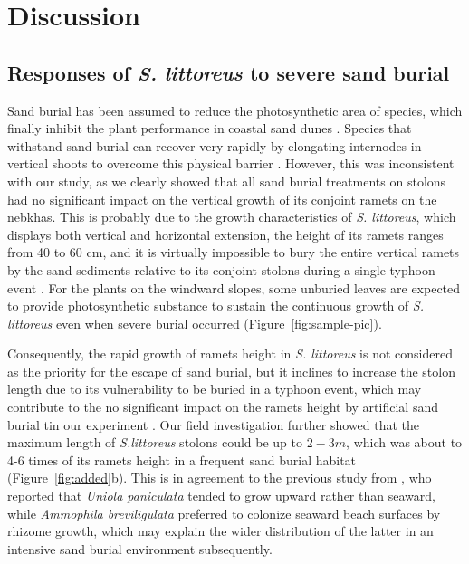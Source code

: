 \documentclass[]{interact}
\theoremstyle{plain}%
\theoremstyle{definition}
\theoremstyle{remark}
\begin{document}
\section{Discussion}

\subsection{Responses of \textit{S. littoreus} to severe sand burial}

Sand burial has been assumed to reduce the photosynthetic area of species, which finally inhibit the plant performance in coastal sand dunes \citep{hespEcologicalProcessesPlant1991, brownMechanismsSurvivingBurial2018}. Species that withstand sand burial can recover very rapidly by elongating internodes in vertical shoots to overcome this physical barrier \citep{frosiniGlobalChangeResponse2012,keijsersModelingBiogeomorphicEvolution2016, quEffectsSandBurial2017,enriquezAssessingBeachDune2019}. However, this was inconsistent with our study, as we clearly showed that all sand burial treatments on stolons had no significant impact on the vertical growth of its conjoint ramets on the nebkhas. This is probably due to the growth characteristics of \textit{S. littoreus}, which displays both vertical and horizontal extension, the height of its ramets ranges from 40 to 60 cm, and it is virtually impossible to bury the entire vertical ramets by the sand sediments relative to its conjoint stolons during a single typhoon event \citep{yangDiurnalvariationcharacteristics2017}. For the plants on the windward slopes, some unburied leaves are expected to provide photosynthetic substance to sustain the continuous growth of \textit{S. littoreus} even when severe burial occurred (Figure~\ref{fig:sample-pic}). 

Consequently, the rapid growth of ramets height in \textit{S. littoreus} is not considered as the priority for the escape of sand burial, but it inclines to increase the stolon length due to its vulnerability to be buried in a typhoon event, which may contribute to the no significant impact on the ramets height by artificial sand burial tin our experiment \citep{maunAdaptationsEnhancingSurvival1994}. Our field investigation further showed that the maximum length of \textit{S.littoreus} stolons could be up to $2-3 m$, which was about to 4-6 times of its ramets height in a frequent sand burial habitat (Figure~\ref{fig:added}b). This is in agreement to the previous study from \citet{woodhouseEffectSpeciesDune1977}, who reported that \textit{Uniola paniculata} tended to grow upward rather than seaward, while \textit{Ammophila breviligulata} preferred to colonize seaward beach surfaces by rhizome growth, which may explain the wider distribution of the latter in an intensive sand burial environment subsequently. 
\end{document}
